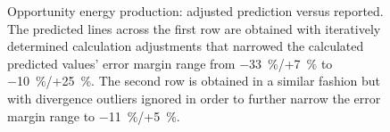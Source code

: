 \begin{figure}[h]
\begin{subfigure}[t]{\subfigureWidth}
		\label{fig:plot:sub:mer-energy-production-predicted-vs-reported-my32-adjusted-without-outliers}
	\end{subfigure}
    \caption[Opportunity energy production: adjusted prediction versus reported]
            {Opportunity energy production: adjusted prediction versus reported. The predicted lines across the first row are obtained with iteratively determined calculation adjustments that narrowed the calculated predicted values' error margin range from \SI{-33}{\percent}/+\SI{7}{\percent} to \SI{-10}{\percent}/+\SI{25}{\percent}. The second row is obtained in a similar fashion but with divergence outliers ignored in order to further narrow the error margin range to \SI{-11}{\percent}/+\SI{5}{\percent}.}
    \label{fig:plot:mer-energy-production-predicted-vs-reported-adjusted-with-and-without-outliers}
\vspace{-2ex}
\end{figure}
